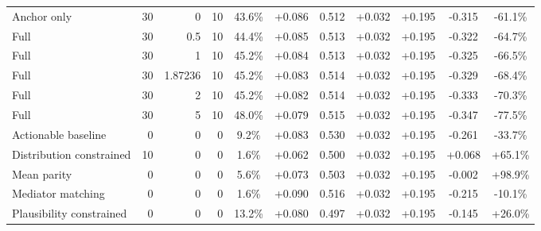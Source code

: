 \begin{table}[htbp]
\begin{tabular}{lrrrccccccc}
Anchor only & 30 & 0 & 10 & 43.6\% & +0.086 & 0.512 & +0.032 & +0.195 & -0.315 & -61.1\% \\
Full & 30 & 0.5 & 10 & 44.4\% & +0.085 & 0.513 & +0.032 & +0.195 & -0.322 & -64.7\% \\
Full & 30 & 1 & 10 & 45.2\% & +0.084 & 0.513 & +0.032 & +0.195 & -0.325 & -66.5\% \\
Full & 30 & 1.87236 & 10 & 45.2\% & +0.083 & 0.514 & +0.032 & +0.195 & -0.329 & -68.4\% \\
Full & 30 & 2 & 10 & 45.2\% & +0.082 & 0.514 & +0.032 & +0.195 & -0.333 & -70.3\% \\
Full & 30 & 5 & 10 & 48.0\% & +0.079 & 0.515 & +0.032 & +0.195 & -0.347 & -77.5\% \\
Actionable baseline & 0 & 0 & 0 & 9.2\% & +0.083 & 0.530 & +0.032 & +0.195 & -0.261 & -33.7\% \\
Distribution constrained & 10 & 0 & 0 & 1.6\% & +0.062 & 0.500 & +0.032 & +0.195 & +0.068 & +65.1\% \\
Mean parity & 0 & 0 & 0 & 5.6\% & +0.073 & 0.503 & +0.032 & +0.195 & -0.002 & +98.9\% \\
Mediator matching & 0 & 0 & 0 & 1.6\% & +0.090 & 0.516 & +0.032 & +0.195 & -0.215 & -10.1\% \\
Plausibility constrained & 0 & 0 & 0 & 13.2\% & +0.080 & 0.497 & +0.032 & +0.195 & -0.145 & +26.0\% \\
\bottomrule
\end{tabular}
\end{table}